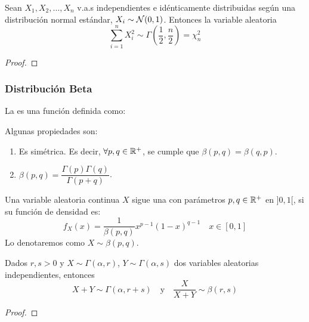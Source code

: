 \begin{teo}
    Sean $X_1, X_2, \ldots, X_n$ v.a.s independientes e idénticamente distribuidas según una distribución normal estándar, $X_i \sim \mathcal{N}(0,1)$. Entonces la variable aleatoria 
    \begin{equation*}
        \sum\limits_{i=1}^{n} X_i^2 \sim \Gamma\left( \dfrac{1}{2}, \dfrac{n}{2} \right)=\chi_n^2
    \end{equation*}
    \begin{proof}
    \end{proof}
\end{teo}

\subsubsection{Distribución Beta}

\begin{definicion}
    La  es una función definida como:
\end{definicion}

Algunas propiedades son:
\begin{enumerate}
    \item Es simétrica. Es decir, $\forall p,q\in \mathbb{R}^+$, se cumple que $\beta(p,q) = \beta(q,p)$.
    \item $\beta(p,q) = \dfrac{\Gamma(p)\Gamma(q)}{\Gamma(p+q)}$.  
\end{enumerate}

\begin{definicion}
    Una variable aleatoria continua $X$ sigue una  con parámetros $p,q\in \mathbb{R}^+$ en $]0,1[$, si su función de densidad es:
    \begin{equation*}
        f_X(x) = \dfrac{1}{\beta(p,q)}x^{p-1}(1-x)^{q-1} \quad  x\in [0,1]
    \end{equation*}
    Lo denotaremos como $X\sim \beta(p,q)$.
\end{definicion}

\begin{prop}
    Dados $r,s>0$ y $X\sim \Gamma(\alpha,r)$, $Y\sim \Gamma(\alpha,s)$ dos variables aleatorias independientes, entonces
    \begin{equation*}
        X+Y \sim \Gamma(\alpha, r+s) \quad \text{y} \quad \dfrac{X}{X+Y} \sim \beta(r,s)
    \end{equation*}
    \begin{proof}
    \end{proof}
\end{prop}


